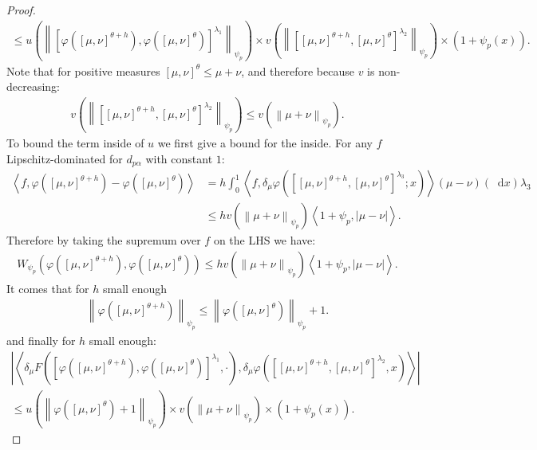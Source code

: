 \documentclass[11pt,a4paper]{article}
\newcommand{\brac}[1]{\left\langle#1\right\rangle}
\newcommand{\dd}{\mathop{}\!\mathrm{d}}
\begin{document}
\begin{proof}
\begin{multline*}
        \leq u\left(\left\|\left[\varphi\left([\mu,\nu]^{\theta + h}\right),\varphi\left([\mu,\nu]^{\theta}\right)\right]^{\lambda_1} \right\|_{\psi_p}\right)\times v\left(\left\|\left[ [\mu,\nu]^{\theta + h}, [\mu,\nu]^{\theta }\right]^{\lambda_2} \right\|_{\psi_p}\right)\times  ( 1 + \psi_p(x)).
    \end{multline*}
    Note that for positive measures $\left[\mu,\nu \right]^\theta \leq \mu + \nu$, and therefore because $v$ is non-decreasing:
    \begin{align*}
        v\left(\left\|\left[ [\mu,\nu]^{\theta + h}, [\mu,\nu]^{\theta }\right]^{\lambda_2} \right\|_{\psi_p}\right) \leq v\left(\left\|\mu + \nu\right\|_{\psi_p}\right).
    \end{align*}
    To bound the term inside of $u$ we first give a bound for the inside. For any $f$ Lipschitz-dominated for $d_{p\alpha}$ with constant $1$:
    \begin{align*}
        \brac{f,\varphi\left([\mu,\nu]^{\theta + h}\right)- \varphi\left([\mu,\nu]^{\theta}\right)}
        &= h\int_0^1 \brac{f, \delta_\mu \varphi \left(\left[ [\mu,\nu]^{\theta + h}, [\mu,\nu]^{\theta }\right]^{\lambda_3};x \right)} (\mu - \nu)(\dd x) \lambda_3\\
        &\leq h v\left(\left\|\mu + \nu\right\|_{\psi_p}\right) \brac{1 + \psi_p, |\mu - \nu|}.
    \end{align*}
    Therefore by taking the supremum over $f$ on the LHS we have:
    \begin{align*}
        W_{\psi_p}\left(\varphi\left([\mu,\nu]^{\theta + h}\right), \varphi\left([\mu,\nu]^{\theta}\right) \right) \leq h v\left(\left\|\mu + \nu\right\|_{\psi_p}\right) \brac{1 + \psi_p, |\mu - \nu|}.
    \end{align*}
    It comes that for $h$ small enough 
    \begin{align*}
        \left\|\varphi\left([\mu,\nu]^{\theta + h}\right)\right\|_{\psi_p} \leq  \left\|\varphi\left([\mu,\nu]^{\theta }\right)\right\|_{\psi_p} + 1.
    \end{align*}
    and finally for $h$ small enough:
    \begin{multline*}
        \left| \brac{\delta_\mu F\left(\left[\varphi\left([\mu,\nu]^{\theta + h}\right),\varphi\left([\mu,\nu]^{\theta}\right)\right]^{\lambda_1}, \cdot \right),\delta_\mu \varphi\left(\left[ [\mu,\nu]^{\theta + h}, [\mu,\nu]^{\theta }\right]^{\lambda_2} ,x\right)} \right| \\
        \leq u\left(\left\|\varphi\left([\mu,\nu]^{\theta }\right)+ 1\right\|_{\psi_p}\right)\times v\left(\left\|\mu + \nu\right\|_{\psi_p}\right)\times  ( 1 + \psi_p(x)).

\end{multline*}
\end{proof}
\end{document}
